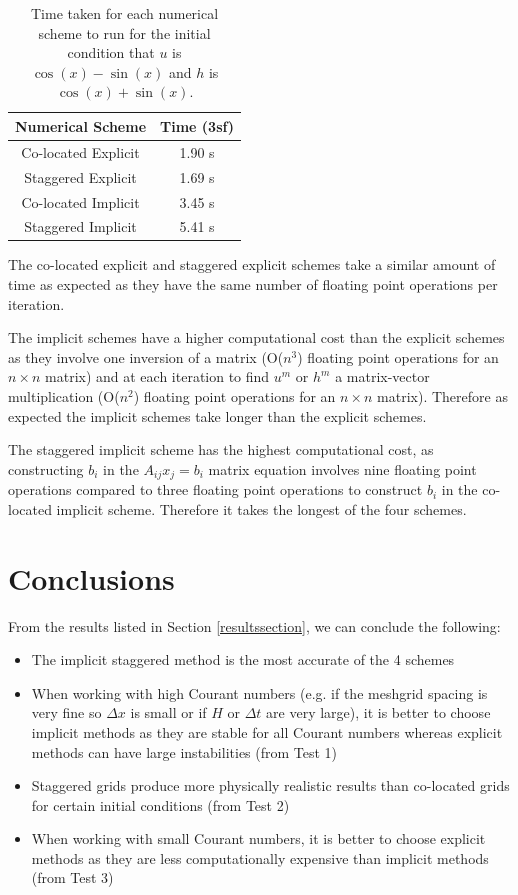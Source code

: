 \documentclass[a4paper,12pt, notitlepage]{article}
\begin{document}
\begin{table}[H]
	\centering
	\begin{tabular}{|c | c|} 
		\hline
		\textbf{Numerical Scheme} & \textbf{Time (3sf)}  \\
		\hline
		Co-located Explicit & 1.90 s \\ 
		\hline
		Staggered Explicit & 1.69 s \\
		\hline
		Co-located  Implicit & 3.45 s \\
		\hline
		Staggered Implicit & 5.41 s \\
		\hline
	\end{tabular}
	\caption{Time taken for each numerical scheme to run for the initial condition that $u$ is $\cos(x) - \sin(x)$ and $h$ is $\cos(x) + \sin(x)$.}
	\label{timingtable}
\end{table}


The co-located explicit and staggered explicit schemes take a similar amount of time as expected as they have the same number of floating point operations per iteration.

The implicit schemes have a higher computational cost than the explicit schemes as they involve one inversion of a matrix (O($n^{3}$) floating point operations for an $n \times n$ matrix) and at each iteration to find $u^{m}$ or $h^{m}$ a matrix-vector multiplication (O($n^{2}$) floating point operations for an $n \times n$ matrix). Therefore as expected the implicit schemes take longer than the explicit schemes.

The staggered implicit scheme has the highest computational cost, as constructing $b_{i}$ in the $A_{ij}x_{j} = b_{i}$ matrix equation involves nine floating point operations compared to three floating point operations to construct $b_{i}$ in the co-located implicit scheme. Therefore it takes the longest of the four schemes.  

\section{Conclusions}

From the results listed in Section \ref{resultssection}, we can conclude the following:

\begin{itemize}
	\item The implicit staggered method is the most accurate of the 4 schemes
	\item When working with high Courant numbers (e.g. if the meshgrid spacing is very fine so $\Delta x$ is small or if $H$ or $\Delta t$ are very large), it is better to choose implicit methods as they are stable for all Courant numbers whereas explicit methods can have large instabilities (from Test 1)
	\item Staggered grids produce more physically realistic results than co-located grids for certain initial conditions (from Test 2)
	\item When working with small Courant numbers, it is better to choose explicit methods as they are less computationally expensive than implicit methods (from Test 3)
\end{itemize}
\end{document}
